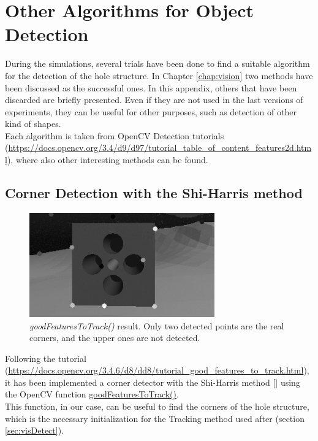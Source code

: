 

\chapter{Other Algorithms for Object Detection}
\label{chap:AppendixVision}
\ifpdf
    \graphicspath{{Vision/Figures/PNG/}{Vision/Figures/PDF/}{Vision/Figures/}}
\else
    \graphicspath{{Vision/Figures/EPS/}{Vision/Figures/}}
\fi

During the simulations, several trials have been done to find a suitable algorithm for the detection of the hole structure. In Chapter \ref{chap:vision} two methods have been discussed as the successful ones. In this appendix, others that have been discarded are briefly presented. Even if they are not used in the last versions of experiments, they can be useful for other purposes, such as detection of other kind of shapes.\\
Each algorithm is taken from OpenCV Detection tutorials (\url{https://docs.opencv.org/3.4/d9/d97/tutorial_table_of_content_features2d.html}), where also other interesting methods can be found.

\section{Corner Detection with the Shi-Harris method}

\begin{figure}[H]
	\centering
	\includegraphics[width=8.0cm]{goodFeatToTrack}
	\caption[Result of \textit{goodFeaturesToTrack()}]{\textit{goodFeaturesToTrack()} result. Only two detected points are the real corners, and the upper ones are not detected.} 
	\label{fig:goodFeatToTrack}
\end{figure}


Following the tutorial (\url{https://docs.opencv.org/3.4.6/d8/dd8/tutorial_good_features_to_track.html}), it has been implemented a corner detector with the Shi-Harris method [\cite{Shi94goodfeatures}] using the OpenCV function \href{https://docs.opencv.org/3.4.6/dd/d1a/group__imgproc__feature.html#ga1d6bb77486c8f92d79c8793ad995d541}{goodFeaturesToTrack()}.\\
This function, in our case, can be useful to find the corners of the hole structure, which is the necessary initialization for the Tracking method used after (section \ref{sec:visDetect}).\\

